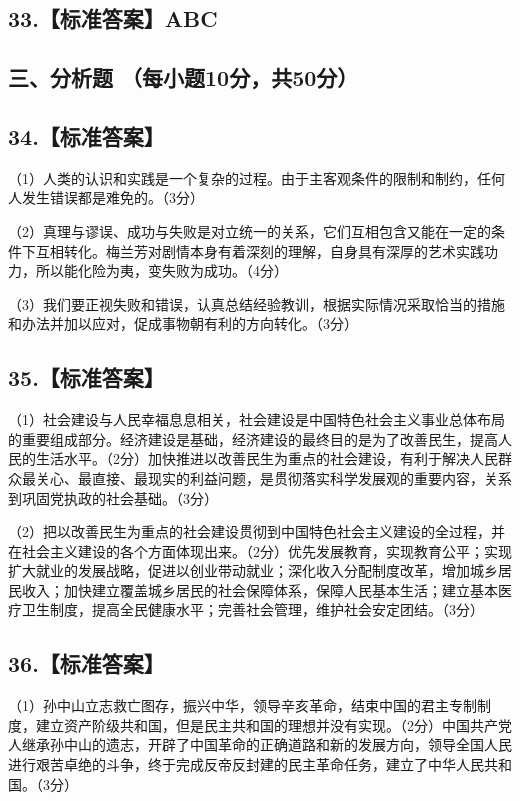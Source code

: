 \documentclass[UTF8,11pt]{ctexart}
\begin{document}
\subsection*{33.【标准答案】ABC}

\subsection*{三、分析题 （每小题10分，共50分）}

\subsection*{34.【标准答案】}

（1）人类的认识和实践是一个复杂的过程。由于主客观条件的限制和制约，任何人发生错误都是难免的。（3分）


（2）真理与谬误、成功与失败是对立统一的关系，它们互相包含又能在一定的条件下互相转化。梅兰芳对剧情本身有着深刻的理解，自身具有深厚的艺术实践功力，所以能化险为夷，变失败为成功。（4分）


（3）我们要正视失败和错误，认真总结经验教训，根据实际情况采取恰当的措施和办法并加以应对，促成事物朝有利的方向转化。（3分）


\subsection*{35.【标准答案】}

（1）社会建设与人民幸福息息相关，社会建设是中国特色社会主义事业总体布局的重要组成部分。经济建设是基础，经济建设的最终目的是为了改善民生，提高人民的生活水平。（2分）加快推进以改善民生为重点的社会建设，有利于解决人民群众最关心、最直接、最现实的利益问题，是贯彻落实科学发展观的重要内容，关系到巩固党执政的社会基础。（3分）


（2）把以改善民生为重点的社会建设贯彻到中国特色社会主义建设的全过程，并在社会主义建设的各个方面体现出来。（2分）优先发展教育，实现教育公平；实现扩大就业的发展战略，促进以创业带动就业；深化收入分配制度改革，增加城乡居民收入；加快建立覆盖城乡居民的社会保障体系，保障人民基本生活；建立基本医疗卫生制度，提高全民健康水平；完善社会管理，维护社会安定团结。（3分）


\subsection*{36.【标准答案】}

（1）孙中山立志救亡图存，振兴中华，领导辛亥革命，结束中国的君主专制制度，建立资产阶级共和国，但是民主共和国的理想并没有实现。（2分）中国共产党人继承孙中山的遗志，开辟了中国革命的正确道路和新的发展方向，领导全国人民进行艰苦卓绝的斗争，终于完成反帝反封建的民主革命任务，建立了中华人民共和国。（3分）
\end{document}
